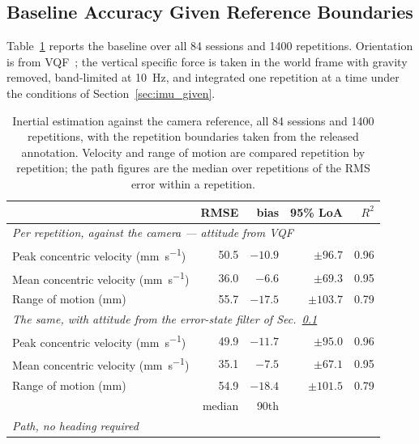 \subsection{Baseline Accuracy Given Reference Boundaries}\label{sec:imu_accuracy}

Table~\ref{tab:imu_baseline} reports the baseline over all \num{84} sessions and
\num{1400} repetitions. Orientation is from VQF~\cite{laidig2023}; the vertical
specific force is taken in the world frame with gravity removed, band-limited at
\SI{10}{\hertz}, and integrated one repetition at a time under the conditions of
Section~\ref{sec:imu_given}.

\begin{table}[t]
  \centering
  \caption{Inertial estimation against the camera reference, all \num{84} sessions and
           \num{1400} repetitions, with the repetition boundaries taken from the released
           annotation. Velocity and range of motion are compared repetition by
           repetition; the path figures are the median over repetitions of the RMS error
           within a repetition.}
  \label{tab:imu_baseline}
  \begin{tabular}{lrrrr}
    \toprule
    & RMSE & bias & 95\% LoA & $R^2$ \\
    \midrule
    \multicolumn{5}{l}{\emph{Per repetition, against the camera --- attitude from VQF}} \\
    Peak concentric velocity (\si{\milli\metre\per\second})  & 50.5 & $-10.9$ & $\pm 96.7$  & 0.96 \\
    Mean concentric velocity (\si{\milli\metre\per\second})  & 36.0 & $-6.6$  & $\pm 69.3$  & 0.95 \\
    Range of motion (\si{\milli\metre})                      & 55.7 & $-17.5$ & $\pm 103.7$ & 0.79 \\
    \midrule
    \multicolumn{5}{l}{\emph{The same, with attitude from the error-state filter of Sec.~\ref{sec:imu_accuracy}}} \\
    Peak concentric velocity (\si{\milli\metre\per\second})  & 49.9 & $-11.7$ & $\pm 95.0$  & 0.96 \\
    Mean concentric velocity (\si{\milli\metre\per\second})  & 35.1 & $-7.5$  & $\pm 67.1$  & 0.95 \\
    Range of motion (\si{\milli\metre})                      & 54.9 & $-18.4$ & $\pm 101.5$ & 0.79 \\
    \midrule
    & median & 90th & & \\
    \midrule
    \multicolumn{5}{l}{\emph{Path, no heading required}} \\

\end{tabular}
\end{table}
